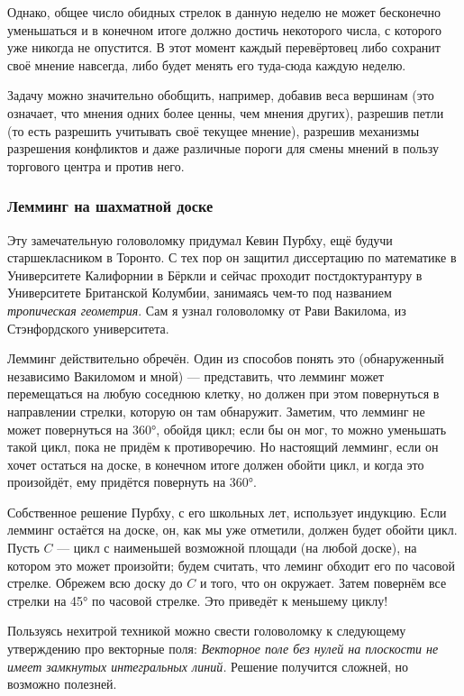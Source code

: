 Однако, общее число обидных стрелок в данную неделю не может бесконечно уменьшаться и в конечном итоге должно достичь некоторого числа, с которого уже никогда не опустится.
В этот момент каждый перевёртовец либо сохранит своё мнение навсегда, либо будет менять его туда-сюда каждую неделю.

\medskip

Задачу можно значительно обобщить, например, добавив веса вершинам (это означает, что мнения одних более ценны, чем мнения других), разрешив петли (то есть разрешить учитывать своё текущее мнение), разрешив механизмы разрешения конфликтов и даже различные пороги для смены мнений в пользу торгового центра и против него.

\subsubsection*{Лемминг на шахматной доске}

Эту замечательную головоломку придумал Кевин Пурбху, ещё будучи старшекласником в Торонто.
С тех пор он защитил диссертацию по математике в Университете Калифорнии в Бёркли и
сейчас проходит постдоктурантуру в Университете Британской Колумбии,
занимаясь чем-то под названием \emph{тропическая геометрия}.
Сам я узнал головоломку от Рави Вакилома, из Стэнфордского университета.

Лемминг действительно обречён.
Один из способов понять это (обнаруженный независимо Вакиломом и мной) --- представить, что лемминг может перемещаться на любую соседнюю клетку, но должен при этом повернуться в направлении стрелки, которую он там обнаружит.
Заметим, что лемминг не может повернуться на 360°, обойдя цикл;
если бы он мог, то можно уменьшать такой цикл, пока не придём к противоречию.
Но настоящий лемминг, если он хочет остаться на доске, в конечном итоге должен обойти цикл, и когда это произойдёт, ему придётся повернуть на 360°.

Собственное решение Пурбху, с его школьных лет, использует индукцию.
Если лемминг остаётся на доске, он, как мы уже отметили, должен будет обойти цикл.
Пусть $C$ --- цикл с наименьшей возможной площади (на любой доске), на котором это может произойти; будем считать, что леминг обходит его по часовой стрелке.
Обрежем всю доску до $C$ и того, что он окружает.
Затем повернём все стрелки на 45° по часовой стрелке.
Это приведёт к меньшему циклу!

\begin{addedbytheeditors}
Пользуясь нехитрой техникой можно свести головоломку к следующему утверждению про векторные поля: \emph{Векторное поле без нулей на плоскости не имеет замкнутых интегральных линий.}
Решение получится сложней, но возможно полезней.
\end{addedbytheeditors}
